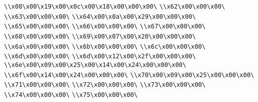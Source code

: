 \verb|\\x08\x00\x19\x00\x0c\x00\x18\x00\x00\x00\|\newline
\verb|\\x62\x00\x00\x00\|\newline
\verb|\\x63\x00\x00\x00\|\newline
\verb|\\x64\x00\x0a\x00\x29\x00\x00\x00\|\newline
\verb|\\x65\x00\x00\x00\|\newline
\verb|\\x66\x00\x00\x00\|\newline
\verb|\\x67\x00\x00\x00\|\newline
\verb|\\x68\x00\x00\x00\|\newline
\verb|\\x69\x00\x07\x00\x20\x00\x00\x00\|\newline
\verb|\\x6a\x00\x00\x00\|\newline
\verb|\\x6b\x00\x00\x00\|\newline
\verb|\\x6c\x00\x00\x00\|\newline
\verb|\\x6d\x00\x00\x00\|\newline
\verb|\\x6d\x00\x12\x00\x2f\x00\x00\x00\|\newline
\verb|\\x6e\x00\x09\x00\x25\x00\x14\x00\x24\x00\x00\x00\|\newline
\verb|\\x6f\x00\x14\x00\x24\x00\x00\x00\|\newline
\verb|\\x70\x00\x09\x00\x25\x00\x00\x00\|\newline
\verb|\\x71\x00\x00\x00\|\newline
\verb|\\x72\x00\x00\x00\|\newline
\verb|\\x73\x00\x00\x00\|\newline
\verb|\\x74\x00\x00\x00\|\newline
\verb|\\x75\x00\x00\x00\|\newline
